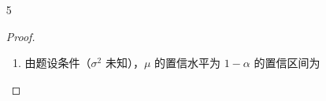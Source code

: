 \documentclass[normal,cn]{elegantnote}
\begin{document}
\begin{enumerate}
\begin{proof}
\begin{enumerate}
\begin{equation*}
                      \end{equation*}
                \item 因 $Y=\ln X$ 服从正态分布 $N\left(\mu,1\right)$，有 $X=\mathrm{e}^{Y}$。 且 $Y$ 的密度函数为
                      \begin{equation*}
                          p(y)=\frac{1}{\sqrt{2\pi}}\mathrm{e}^{-\frac{(y-\mu)^{2}}{2}}
                      \end{equation*}
                      则
                      \begin{equation*}
                          \begin{aligned}
                              E(X)= & \int_{-\infty}^{+\infty}\mathrm{e}^{y}\cdot\frac{1}{\sqrt{2\pi}}\mathrm{e}^{-\frac{(y-\mu)^{2}}{2}}\,\mathrm{d}y                                           \\
                              =     & \int_{-\infty}^{+\infty}\frac{1}{\sqrt{2\pi}}\mathrm{e}^{-\frac{y^{2}-2\mu y+\mu^{2}-2 }{2}}\,\mathrm{d}y                                                  \\
                              =     & \int_{-\infty}^{+\infty}\frac{1}{\sqrt{2\pi}}\mathrm{e}^{-\frac{y^{2}-2(\mu+1)y+(\mu+1)^{2}-2\mu-1}{2}}\,\mathrm{d}y                                       \\
                              =     & \mathrm{e}^{\mu+\frac{1}{2}}\int_{-\infty}^{+\infty}\frac{1}{\sqrt{2 \pi}} \mathrm{e}^{-\frac{(y-\mu-1)^{2}}{2}}\,\mathrm{d}y=\mathrm{e}^{\mu+\frac{1}{2}}
                          \end{aligned}
                      \end{equation*}
                      由于 $E(X)=\mathrm{e}^{\mu+\frac{1}{2}}$ 为 $\mu$ 的严格单调增函数，因此，$E(X)$ 的置信水平为 95\% 的置信区间为
                      \begin{equation*}
                          \left[\mathrm{e}^{-0.98+0.5},\mathrm{e}^{0.98+0.5}\right]=[0.6188,4.3929]
                      \end{equation*}
            \end{enumerate}
        \end{proof}
    \item[5]
        \begin{proof}
            \begin{enumerate}
                \item 由题设条件（$\sigma^{2}$ 未知），$\mu$ 的置信水平为 $1-\alpha$ 的置信区间为
                      \begin{equation*}

\end{equation*}
\end{enumerate}
\end{proof}
\end{enumerate}
\end{document}
